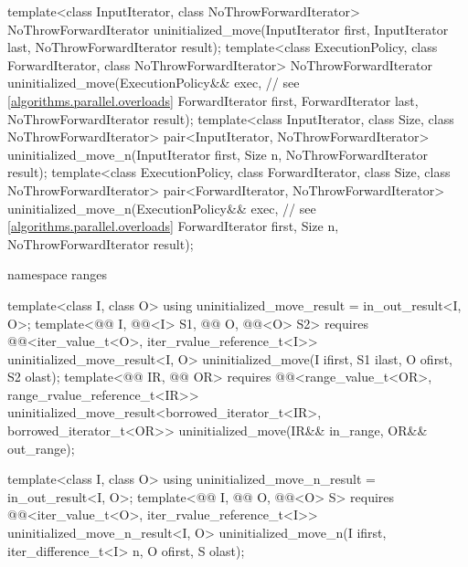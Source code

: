 \begin{codeblock}
{  template<class InputIterator, class NoThrowForwardIterator>
    NoThrowForwardIterator uninitialized_move(InputIterator first, InputIterator last,
                                              NoThrowForwardIterator result);
  template<class ExecutionPolicy, class ForwardIterator, class NoThrowForwardIterator>
    NoThrowForwardIterator uninitialized_move(ExecutionPolicy&& exec,   // see \ref{algorithms.parallel.overloads}
                                              ForwardIterator first, ForwardIterator last,
                                              NoThrowForwardIterator result);
  template<class InputIterator, class Size, class NoThrowForwardIterator>
    pair<InputIterator, NoThrowForwardIterator>
      uninitialized_move_n(InputIterator first, Size n, NoThrowForwardIterator result);
  template<class ExecutionPolicy, class ForwardIterator, class Size,
           class NoThrowForwardIterator>
    pair<ForwardIterator, NoThrowForwardIterator>
      uninitialized_move_n(ExecutionPolicy&& exec,              // see \ref{algorithms.parallel.overloads}
                           ForwardIterator first, Size n, NoThrowForwardIterator result);

  namespace ranges {
    template<class I, class O>
      using uninitialized_move_result = in_out_result<I, O>;
    template<@@ I, @@<I> S1,
             @@ O, @@<O> S2>
      requires @@<iter_value_t<O>, iter_rvalue_reference_t<I>>
        uninitialized_move_result<I, O>
          uninitialized_move(I ifirst, S1 ilast, O ofirst, S2 olast);
    template<@@ IR, @@ OR>
      requires @@<range_value_t<OR>, range_rvalue_reference_t<IR>>
        uninitialized_move_result<borrowed_iterator_t<IR>, borrowed_iterator_t<OR>>
          uninitialized_move(IR&& in_range, OR&& out_range);

    template<class I, class O>
      using uninitialized_move_n_result = in_out_result<I, O>;
    template<@@ I,
             @@ O, @@<O> S>
      requires @@<iter_value_t<O>, iter_rvalue_reference_t<I>>
        uninitialized_move_n_result<I, O>
          uninitialized_move_n(I ifirst, iter_difference_t<I> n, O ofirst, S olast);
  }

}
\end{codeblock}
